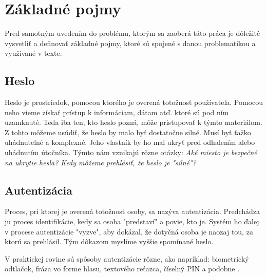 \section{Základné pojmy}
Pred samotným uvedením do problému, ktorým sa zaoberá táto práca je dôležité vysvetliť a definovať základné pojmy, ktoré sú spojené s danou problematikou a využívané v texte. 

\subsection{Heslo}
Heslo je prostriedok, pomocou ktorého je overená totožnosť používateľa. \cite{1} Pomocou neho vieme získať prístup k informáciam, dátam atď. ktoré sú pod ním uzamknuté. Teda iba ten, kto heslo pozná, môže pristupovať k týmto materiálom. Z tohto môžeme usúdiť, že heslo by malo byť dostatočne silné. Musí byť ťažko uhádnuteľné a komplexné. Jeho vlastník by ho mal ukryť pred odhalením alebo uhádnutím útočníka. Týmto nám vznikajú rôzne otázky: \textit{Aké miesto je bezpečné na ukrytie hesla? Kedy môžeme prehlásiť, že heslo je "silné"?}

\subsection{Autentizácia}
\cite{2} Proces, pri ktorej je overená totožnosť osoby, sa nazýva autentizácia. Predchádza ju proces identifikácie, kedy sa osoba "predstaví" a povie, kto je. Systém ho ďalej v procese autentizácie "vyzve", aby dokázal, že dotyčná osoba je naozaj tou, za ktorú sa prehlásil. Tým dôkazom myslíme vyššie spomínané heslo.
	\par V praktickej rovine sú spôsoby autentizácie rôzne, ako napríklad: biometrický odtlačok, fráza vo forme hlasu, textového reťazca, číselný PIN a podobne \cite{3}. 

